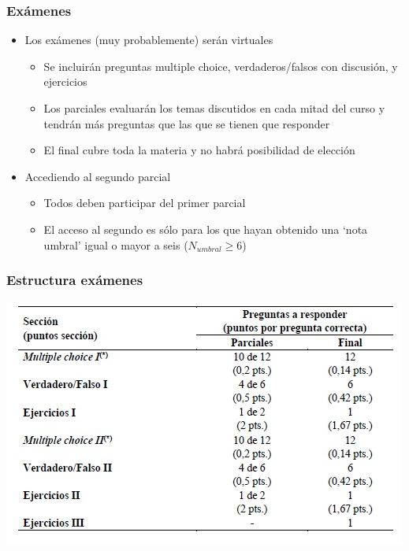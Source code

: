 \documentclass[14pt]{beamer}
\begin{document}
\begin{frame}
\frametitle{Exámenes}
\begin{itemize}
    \item Los exámenes (muy probablemente) serán virtuales
        \begin{itemize}
            \item Se incluirán preguntas multiple choice, verdaderos/falsos con discusión, y ejercicios
            \item Los parciales evaluarán los temas discutidos en cada mitad del curso y tendrán más preguntas que las que se tienen que responder
            \item El final cubre toda la materia y no habrá posibilidad de elección
        \end{itemize}
    \item Accediendo al segundo parcial
        \begin{itemize}
            \item Todos deben participar del primer parcial
            \item El acceso al segundo es sólo para los que hayan obtenido una ‘nota umbral’ igual o mayor a seis ($N_{umbral} \geq 6$)
        \end{itemize}
\end{itemize}
\end{frame}

\begin{frame}
\frametitle{Estructura exámenes}
\centering
\includegraphics[scale=0.8]{Figures/examenes.jpg}
\end{frame}
\end{document}
